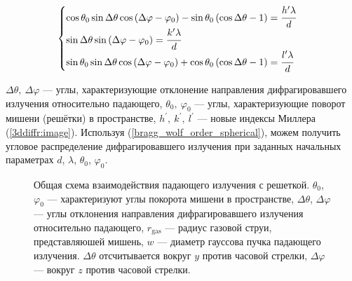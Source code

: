     \begin{equation}
        \begin{cases}
            \cos{\theta_0}\sin{\Delta \theta}\cos{\left( \Delta \varphi - \varphi_0 \right)} - \sin{\theta_0} \left( \cos{\Delta \theta} - 1 \right) = \cfrac{h^{\prime} \lambda}{d}
            \\
            \sin{\Delta \theta} \sin{\left( \Delta \varphi - \varphi_0 \right)} = \cfrac{k^{\prime} \lambda}{d}
            \\
            \sin{\theta_0}\sin{\Delta \theta}\cos{\left( \Delta \varphi - \varphi_0 \right)} + \cos{\theta_0} \left( \cos{\Delta \theta} - 1 \right)= \cfrac{l^{\prime} \lambda}{d}
        \end{cases}
        \label{bragg_wolf_order_spherical}
    \end{equation}

 $\Delta \theta,\:\Delta \varphi$ --- углы, характеризующие отклонение направления дифрагировавшего излучения относительно падающего, $\theta_0,\:\varphi_0$ --- углы, характеризующие поворот мишени (решётки) в пространстве, $h^\prime,\:k^\prime,\:l^\prime$ --- новые индексы Миллера (\autoref{3ddiffr:image}). Используя (\ref{bragg_wolf_order_spherical}), можем получить угловое распределение дифрагировавшего излучения при заданных начальных параметрах $d$, $\lambda$, $\theta_0$, $\varphi_0$. 

    \begin{figure}[H]
        \hfil
        \caption{Общая схема взаимодействия падающего излучения с решеткой. $\theta_0$, $\varphi_0$ --- характеризуют углы покорота мишени в пространстве, $\Delta \theta$, $\Delta \varphi$ --- углы отклонения направления дифрагировавшего излучения относительно падающего, $r_{\textrm{gas}}$ --- радиус газовой струи, представляюшей мишень, $w$ --- диаметр гауссова пучка падающего излучения. $\Delta \theta$ отсчитывается вокруг $y$ против часовой стрелки, $\Delta \varphi$ --- вокруг $z$ против часовой стрелки.}\label{3ddiffr:image}
    \end{figure}



